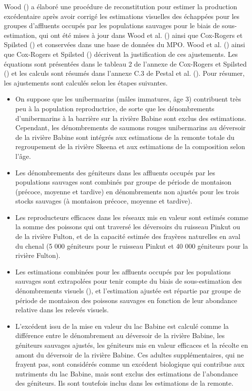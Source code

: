 \documentclass[french,11pt]{book}
\begin{document}
Wood () a élaboré une procédure de reconstitution pour estimer la production excédentaire après avoir corrigé les estimations visuelles des échappées pour les groupes d'affluents occupés par les populations sauvages pour le biais de sous-estimation, qui ont été mises à jour dans Wood et al. () ainsi que Cox-Rogers et Spilsted () et conservées dans une base de données du MPO. Wood et al. () ainsi que Cox-Rogers et Spilsted () décrivent la justification de ces ajustements. Les équations sont présentées dans le tableau 2 de l'annexe de Cox-Rogers et Spilsted () et les calculs sont résumés dans l'annexe C.3 de Pestal et al. (). Pour résumer, les ajustements sont calculés selon les étapes suivantes.
\begin{itemize}

\item
  On suppose que les unibermarins (mâles immatures, âge 3) contribuent très peu à la population reproductrice, de sorte que les dénombrements d'unibermarins à la barrière sur la rivière Babine sont exclus des estimations. Cependant, les dénombrements de saumons rouges unibermarins au déversoir de la rivière Babine sont intégrés aux estimations de la remonte totale du regroupement de la rivière Skeena et aux estimations de la composition selon l'âge.
\item
  Les dénombrements des géniteurs dans les affluents occupés par les populations sauvages sont combinés par groupe de période de montaison (précoce, moyenne et tardive) en dénombrements non ajustés pour les trois stocks sauvages (à montaison précoce, moyenne et tardive).
\item
  Les reproducteurs efficaces dans les réseaux mis en valeur sont estimés comme la somme des poissons qui ont traversé les déversoirs du ruisseau Pinkut ou de la rivière Fulton, et de la capacité estimée des frayères naturelles en aval du chenal (5 000 géniteurs pour le ruisseau Pinkut et 40 000 géniteurs pour la rivière Fulton).
\item
  Les estimations combinées pour les affluents occupés par les populations sauvages sont extrapolées pour tenir compte du biais de sous-estimation des dénombrements visuels (), et l'estimation ajustée est répartie par groupe de période de montaison des poissons sauvages en fonction de leur abondance relative dans les relevés visuels.
\item
  L'excédent issu de la mise en valeur du lac Babine est calculé comme la différence entre le dénombrement au déversoir de la rivière Babine, les géniteurs sauvages ajustés, les géniteurs mis en valeur efficaces et la récolte en amont du déversoir de la rivière Babine. Ces adultes supplémentaires, qui ne frayent pas, sont considérés comme un excédent biologique qui contribue aux nutriments du lac Babine, mais sont exclus des estimations de l'abondance des géniteurs. Ils sont toutefois inclus dans les estimations de la remonte.
\end{itemize}
\end{document}
